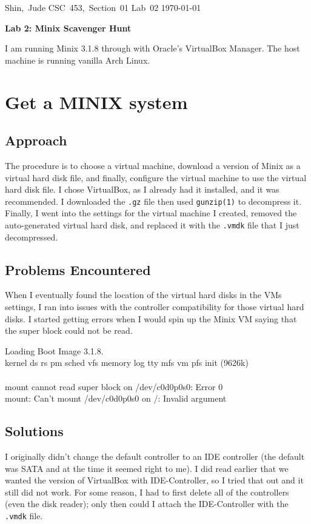 \documentclass[11pt]{article}
\begin{document}
\hfill\vbox{\hbox{Shin, Jude}
		\hbox{CSC 453, Section 01}	
		\hbox{Lab 02}	
		\hbox{\today}}\par

\bigskip
\centerline{\Large\bf Lab 2: {\sc Minix} Scavenger Hunt}\par
\bigskip
I am running {\sc Minix 3.1.8} through with Oracle's {\sc VirtualBox Manager}. The host machine is running vanilla {\sc Arch Linux}.

\setcounter{section}{0}
\section{Get a MINIX system}
\subsection{Approach}
The procedure is to choose a virtual machine, download a version of {\sc Minix} as a virtual hard disk file, and finally, configure the virtual machine to use the virtual hard disk file. I chose {\sc VirtualBox}, as I already had it installed, and it was recommended. I downloaded the {\tt .gz} file then used {\tt gunzip(1)} to decompress it. Finally, I went into the settings for the virtual machine I created, removed the auto-generated virtual hard disk, and replaced it with the {\tt .vmdk} file that I just decompressed. 

\subsection{Problems Encountered}
When I eventually found the location of the virtual hard disks in the VMs settings, I ran into issues with the controller compatibility for those virtual hard disks. I started getting errors when I would spin up the {\sc Minix} VM saying that the super block could not be read. 

{\tt\begin{tabbing}
Loading Boot Image 3.1.8.\\
kernel ds rs pm sched vfs memory log tty mfs vm pfs init (9626k)\\
\\
mount cannot read super block on /dev/c0d0p0s0: Error 0\\
mount: Can't mount /dev/c0d0p0s0 on /: Invalid argument\\
\end{tabbing}}

\subsection{Solutions}
I originally didn't change the default controller to an IDE controller (the default was SATA and at the time it seemed right to me). I did read earlier that we wanted the version of {\sc VirtualBox} with IDE-Controller, so I tried that out and it still did not work. For some reason, I had to first delete all of the controllers (even the disk reader); only then could I attach the IDE-Controller with the {\tt .vmdk} file.
\end{document}
